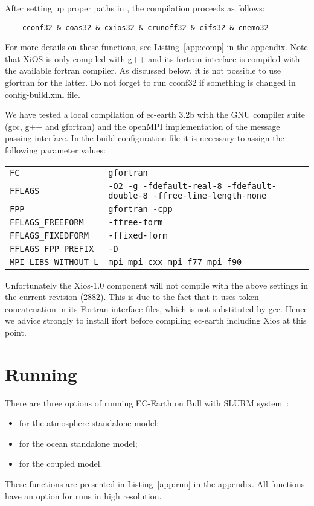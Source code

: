 After setting up proper paths in , the compilation proceeds as follows:
\begin{verbatim}
    cconf32 & coas32 & cxios32 & crunoff32 & cifs32 & cnemo32  
\end{verbatim}
For more details on these functions, see Listing~\ref{app:comp} in the appendix. 
Note that XiOS is only compiled with g++ and its fortran interface is compiled with the available fortran compiler. As discussed below, it is not possible to use gfortran for the latter. Do not forget to run cconf32 if something is changed in config-build.xml file.

We have tested a local compilation of ec-earth 3.2b with the GNU compiler suite (gcc, g++ and gfortran) and the openMPI implementation of the message passing interface. In the build configuration file it is necessary to assign the following parameter values:
\begin{center}
\begin{tabular}{ll}
\texttt{FC}&\texttt{gfortran}\\
\texttt{FFLAGS}&\texttt{-O2 -g -fdefault-real-8 -fdefault-double-8 -ffree-line-length-none}\\
\texttt{FPP}&\texttt{gfortran -cpp}\\
\texttt{FFLAGS\_FREEFORM}&\texttt{-ffree-form}\\
\texttt{FFLAGS\_FIXEDFORM}&\texttt{-ffixed-form}\\
\texttt{FFLAGS\_FPP\_PREFIX}&\texttt{-D}\\
\texttt{MPI\_LIBS\_WITHOUT\_L}&\texttt{mpi mpi\_cxx mpi\_f77 mpi\_f90}\\
\end{tabular}
\end{center}
Unfortunately the Xios-1.0 component will not compile with the above settings in the current revision (2882). This is due to the fact that it uses token concatenation in its Fortran interface files, which is not substituted by gcc. Hence we advice strongly to install ifort before compiling ec-earth including Xios at this point. 

\section{Running}
There are three options of running EC-Earth on Bull with SLURM system~\cite{slurm}:
\begin{itemize}
  \item {} for the atmosphere standalone model;    
  \item {} for the ocean standalone model;    
  \item {} for the coupled model.
\end{itemize}
These functions are presented in Listing~\ref{app:run} in the appendix. All functions have an option  for runs in high resolution. 